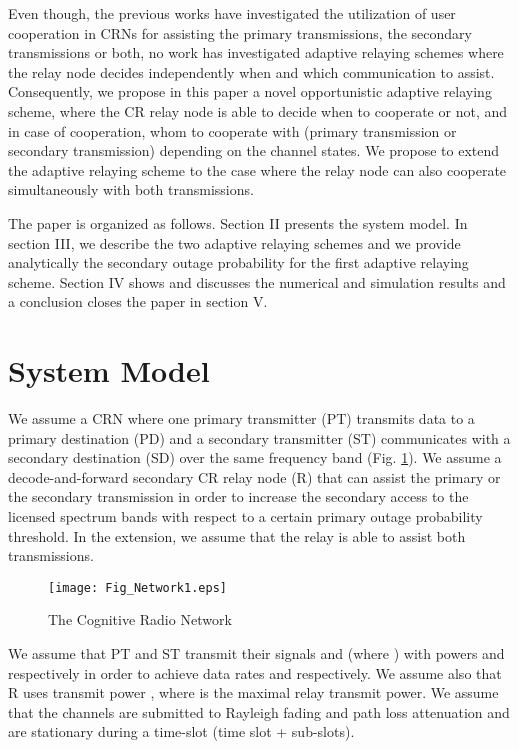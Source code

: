 \documentclass[conference,twocolumn]{IEEEtran}
\begin{document}
Even though, the previous works have investigated the utilization of user cooperation in CRNs for assisting the
primary transmissions, the secondary transmissions or both, no work has investigated adaptive relaying schemes where the relay node decides independently when and which communication to assist. Consequently, we propose in this paper a novel opportunistic adaptive relaying scheme, where the CR relay node is able to decide when to cooperate or not, and in case of cooperation, whom to cooperate with (primary transmission or secondary transmission) depending on the channel states. We propose to extend the adaptive relaying scheme to the case where the relay node can also cooperate simultaneously with both transmissions.

The paper is organized as follows. Section II presents the system
model. In section III, we describe the two adaptive relaying schemes and we provide analytically the secondary outage probability for the first adaptive relaying scheme. Section IV shows and discusses the numerical and simulation results and a conclusion closes the paper in section V.

\section{System Model}

We assume a CRN where one primary transmitter (PT)
transmits data to a primary destination (PD) and a secondary
transmitter (ST) communicates with a secondary destination (SD)
over the same frequency band (Fig. \ref{Fig:Network}). We assume a decode-and-forward secondary CR relay node (R) that can assist the primary or the secondary transmission in order to increase the secondary access to the licensed spectrum bands with respect to a certain primary outage probability threshold. In the extension, we assume that the relay is able to assist both transmissions.
\begin{figure}[t]
\centering
  \texttt{[image: Fig\_Network1.eps]}
  \caption{The Cognitive Radio Network}
  \label{Fig:Network}
\end{figure}

We assume that PT and ST transmit their signals  and 
(where ) with powers  and
 respectively in order to achieve data rates  and
 respectively. We assume also that R uses transmit power , where  is the maximal relay transmit power.
We assume that the channels are submitted to Rayleigh fading
and path loss attenuation and are stationary during a time-slot (time slot 
+  sub-slots).
\end{document}
